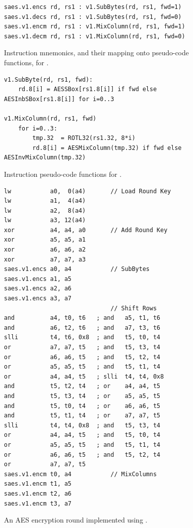 
\vspace*{\fill}

\begin{figure}[!h]
\begin{lstlisting}[language=pseudo,style=block]
saes.v1.encs rd, rs1 : v1.SubBytes(rd, rs1, fwd=1)
saes.v1.decs rd, rs1 : v1.SubBytes(rd, rs1, fwd=0)
saes.v1.encm rd, rs1 : v1.MixColumn(rd, rs1, fwd=1)
saes.v1.decm rd, rs1 : v1.MixColumn(rd, rs1, fwd=0)
\end{lstlisting}
\caption{
  Instruction mnemonics, and their mapping onto pseudo-code functions, for .
}
\label{fig:v1:mnemonics}
\end{figure}

\begin{figure}[!h]
\begin{lstlisting}[language=pseudo,style=block]
v1.SubByte(rd, rs1, fwd):
    rd.8[i] = AESSBox[rs1.8[i]] if fwd else AESInbSBox[rs1.8[i]] for i=0..3

v1.MixColumn(rd, rs1, fwd)
    for i=0..3:
        tmp.32  = ROTL32(rs1.32, 8*i)
        rd.8[i] = AESMixColumn(tmp.32) if fwd else AESInvMixColumn(tmp.32)
\end{lstlisting}
\caption{
  Instruction pseudo-code functions for .
}
\label{fig:v1:pseudo}
\end{figure}

\begin{figure}[!h]
\begin{lstlisting}[language=pseudo,style=block]
lw           a0,  0(a4)       // Load Round Key
lw           a1,  4(a4)
lw           a2,  8(a4)
lw           a3, 12(a4)
xor          a4, a4, a0       // Add Round Key
xor          a5, a5, a1
xor          a6, a6, a2
xor          a7, a7, a3
saes.v1.encs a0, a4           // SubBytes
saes.v1.encs a1, a5
saes.v1.encs a2, a6
saes.v1.encs a3, a7
                              // Shift Rows
and          a4, t0, t6   ; and   a5, t1, t6
and          a6, t2, t6   ; and   a7, t3, t6
slli         t4, t6, 0x8  ; and   t5, t0, t4
or           a7, a7, t5   ; and   t5, t3, t4
or           a6, a6, t5   ; and   t5, t2, t4
or           a5, a5, t5   ; and   t5, t1, t4
or           a4, a4, t5   ; slli  t4, t4, 0x8
and          t5, t2, t4   ; or    a4, a4, t5
and          t5, t3, t4   ; or    a5, a5, t5
and          t5, t0, t4   ; or    a6, a6, t5
and          t5, t1, t4   ; or    a7, a7, t5
slli         t4, t4, 0x8  ; and   t5, t3, t4
or           a4, a4, t5   ; and   t5, t0, t4
or           a5, a5, t5   ; and   t5, t1, t4
or           a6, a6, t5   ; and   t5, t2, t4
or           a7, a7, t5
saes.v1.encm t0, a4           // MixColumns
saes.v1.encm t1, a5
saes.v1.encm t2, a6
saes.v1.encm t3, a7
\end{lstlisting}
\caption{
  An AES encryption round implemented using .
}
\label{fig:v1:round}
\end{figure}

